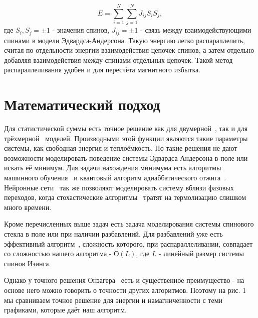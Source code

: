 \documentclass[utf8, babel, sor, jor, amsmath, amssymb, reprint]{elsarticle} %
\begin{document}
	\begin{equation}
		E = \sum\limits_{i=1}^N \sum\limits_{j=1}^N J_{ij} S_i S_j,
	\end{equation}
	где $S_i, S_j = \pm 1$ - значения спинов, $J_{ij} = \pm 1$ - связь между взаимодействующими спинами в модели Эдвардса-Андерсона. Такую энергию легко распараллелить, считая по отдельности энергии взаимодействия цепочек спинов, а затем отдельно добавляя взаимодействия между спинами отдельных цепочек. Такой метод распараллеливания удобен и для пересчёта магнитного избытка. 

	\section{Математический подход}

	Для статистической суммы есть точное решение как для двумерной~\cite{onsager1944crystal}, так и для трёхмерной~\cite{zhang2023exact} моделей. Производными этой функции являются такие параметры системы, как свободная энергия и теплоёмкость. Но такие решения не дают возможности моделировать поведение системы Эдвардса-Андерсона в поле или искать её минимум. Для задачи нахождения минимума есть алгоритмы машинного обучения~\cite{maren1991logical} и квантовый алгоритм адиаббатического отжига~\cite{grant2020adiabatic}. Нейронные сети~\cite{Korol2021} так же позволяют моделировать систему вблизи фазовых переходов, когда стохастические алгоритмы~\cite{janke2008monte} тратят на термолизацию слишком много времени.

	Кроме перечисленных выше задач есть задача моделирования системы спинового стекла в поле или при наличии разбавлений. Для разбавлений уже есть эффективный алгоритм~\cite{loh2006efficient}, сложность которого, при распараллеливании, совпадает со сложностью нашего алгоритма - $О(L)$, где $L$ - линейный размер системы спинов Изинга.

	Однако у точного решения Онзагера~\cite{onsager1944crystal} есть и существенное преимущество - на основе него можно говорить о точности других алгоритмов. Поэтому на рис. 1 мы сравниваем точное решение для энергии и намагниченности с теми графиками, которые даёт наш алгоритм.
\end{document}
